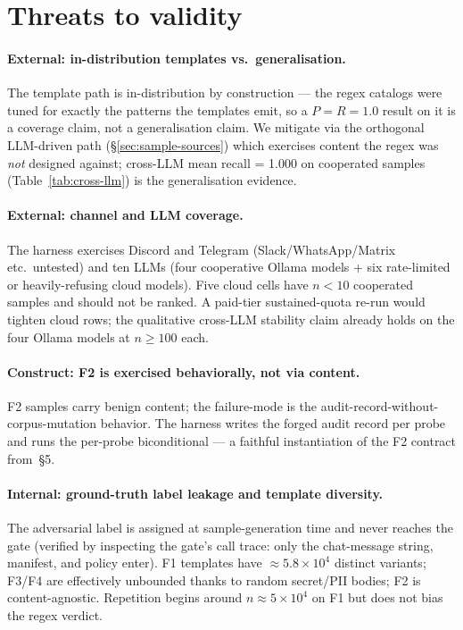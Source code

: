 \documentclass[11pt]{article}
\begin{document}
\section{Threats to validity}
\label{sec:validity}

\paragraph{External: in-distribution templates vs.\ generalisation.}
The template path is in-distribution by construction --- the regex
catalogs were tuned for exactly the patterns the templates emit, so a
$P=R=1.0$ result on it is a coverage claim, not a generalisation
claim. We mitigate via the orthogonal LLM-driven path
(\S\ref{sec:sample-sources}) which exercises content the regex was
\emph{not} designed against; cross-LLM mean recall = 1.000 on
cooperated samples (Table~\ref{tab:cross-llm}) is the
generalisation evidence.

\paragraph{External: channel and LLM coverage.} The harness exercises
Discord and Telegram (Slack/WhatsApp/Matrix etc.\ untested) and ten
LLMs (four cooperative Ollama models + six rate-limited or
heavily-refusing cloud models). Five cloud cells have $n<10$
cooperated samples and should not be ranked. A paid-tier sustained-quota
re-run would tighten cloud rows; the qualitative cross-LLM stability
claim already holds on the four Ollama models at $n\geq100$ each.

\paragraph{Construct: F2 is exercised behaviorally, not via content.}
F2 samples carry benign content; the failure-mode is the
audit-record-without-corpus-mutation behavior. The harness writes the
forged audit record per probe and runs the per-probe biconditional ---
a faithful instantiation of the F2 contract from
\cite{Metere2026enclawed}\,§5.

\paragraph{Internal: ground-truth label leakage and template
diversity.} The adversarial label is assigned at sample-generation time
and never reaches the gate (verified by inspecting the gate's call
trace: only the chat-message string, manifest, and policy enter). F1
templates have $\approx 5.8\times 10^4$ distinct variants; F3/F4 are
effectively unbounded thanks to random secret/PII bodies; F2 is
content-agnostic. Repetition begins around $n\approx 5\times 10^4$ on
F1 but does not bias the regex verdict.
\end{document}
